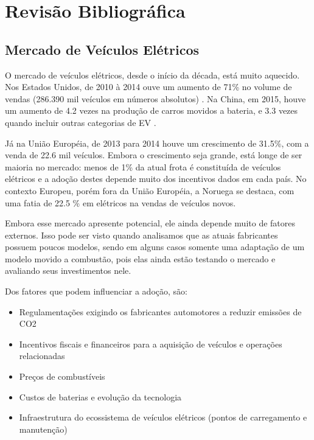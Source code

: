 \chapter{Revisão Bibliográfica}

  \section{Mercado de Veículos Elétricos}

    O mercado de veículos elétricos, desde o início da década, está muito aquecido. Nos Estados Unidos, de 2010 à 2014 ouve um aumento de 71\% no volume de vendas (286.390 mil veículos em números absolutos) \cite{fsec-report-ev}. Na China, em 2015, houve um aumento de 4.2 vezes na produção de carros movidos a bateria, e 3.3 vezes quando incluir outras categorias de \ac{EV} \cite{caam-report-ev}.

    Já na União Européia, de 2013 para 2014 houve um crescimento de 31.5\%, com a venda de 22.6 mil veículos. Embora o crescimento seja grande, está longe de ser maioria no mercado: menos de 1\% da atual frota é constituída de veículos elétricos e a adoção destes depende muito dos incentivos dados em cada país. No contexto Europeu, porém fora da União Européia, a Noruega se destaca, com uma fatia de 22.5 \% em elétricos na vendas de veículos novos. \cite{mckinsey-report-ev}

    Embora esse mercado apresente potencial, ele ainda depende muito de fatores externos. Isso pode ser visto quando analisamos que as atuais fabricantes possuem poucos modelos, sendo em alguns casos somente uma adaptação de um modelo movido a combustão, pois elas ainda estão testando o mercado e avaliando seus investimentos nele.

    Dos fatores que podem influenciar a adoção, são:

    \begin{itemize}
      \item Regulamentações exigindo os fabricantes automotores a reduzir emissões de CO2
      \item Incentivos fiscais e financeiros para a aquisição de veículos e operações relacionadas
      \item Preços de combustíveis
      \item Custos de baterias e evolução da tecnologia
      \item Infraestrutura do ecossistema de veículos elétricos (pontos de carregamento e manutenção)
    \end{itemize}

